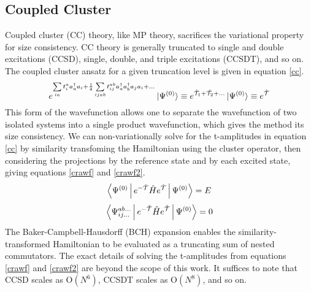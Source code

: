 \documentclass{article}
\begin{document}
\subsection{Coupled Cluster}
\begin{paragraph}{}
Coupled cluster (CC) theory, like MP theory, sacrifices the variational property for size consistency. \cite{atkins}  CC theory is generally truncated to single and double excitations (CCSD), single, double, and triple excitations (CCSDT), and so on. \cite{crawford}  The coupled cluster ansatz for a given truncation level is given in equation \ref{cc}. \cite{crawford}
\begin{equation}\label{cc}
e^{\sum\limits_{ia}t_i^a a_a^\dagger a_i+\frac{1}{4}\sum\limits_{ijab}t_{ij}^{ab} a_a^\dagger a_b^\dagger a_j a_i+...}\ket{\Psi^{\left(0\right)}}\equiv e^{\hat{\mathcal{T}}_1+\hat{\mathcal{T}_2}+...}\ket{\Psi^{\left(0\right)}}\equiv e^{\hat{\mathcal{T}}}
\end{equation}
This form of the wavefunction allows one to separate the wavefunction of two isolated systems into a single product wavefunction, which gives the method its size consistency. \cite{szabo}\cite{crawford} We can non-variationally solve for the t-amplitudes in equation \ref{cc} by similarity transfoming the Hamiltonian using the cluster operator, then considering the projections by the reference state and by each excited state, giving equations \ref{crawf} and \ref{crawf2}. \cite{crawford}
\begin{equation}\label{crawf}
\Braket{\Psi^{\left(0\right)}|e^{-\hat{\mathcal{T}}}\hat{H}e^{\hat{\mathcal{T}}}|\Psi^{\left(0\right)}}=E
\end{equation}
\begin{equation}\label{crawf2}
\Braket{\Psi_{ij...}^{ab...}|e^{-\hat{\mathcal{T}}}\hat{H}e^{\hat{\mathcal{T}}}|\Psi^{\left(0\right)}}=0
\end{equation}
The Baker-Campbell-Hausdorff (BCH) expansion enables the similarity-transformed Hamiltonian to be evaluated as a truncating sum of nested commutators. \cite{crawford} The exact details of solving the t-amplitudes from equations \ref{crawf} and \ref{crawf2} are beyond the scope of this work.  It suffices to note that CCSD scales as O$(N^6)$, CCSDT scales as O$(N^8)$, and so on. \cite{jensen}  
\end{paragraph}
\end{document}
